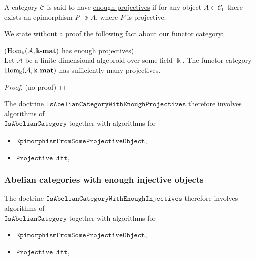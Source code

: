 \begin{definition}\label{def:enough_projectives}
A category $\mathcal{C}$ is said to have \ul{enough projectives} if for any object $A \in \mathcal{C}_{0}$
there exists an epimorphism $P \twoheadrightarrow A$, where $P$ is projective.
\end{definition}

We state without a proof the following fact about our functor category:

\begin{theorem}{($\mathrm{Hom_{\Bbbk}}(\mathcal{A},\Bbbk\textnormal{-}\mathbf{mat})$ has enough projectives)}\\
Let $\mathcal{A}$ be a finite-dimensional algebroid over some field $\Bbbk$. The functor category $\mathrm{Hom_{\Bbbk}}(\mathcal{A},\Bbbk\textnormal{-}\mathbf{mat})$ has sufficiently many
projectives.
\end{theorem}
\begin{proof}
(no proof)
\end{proof}

\begin{doctrine}
The doctrine $\mathtt{IsAbelianCategoryWithEnoughProjectives}$ therefore involves algorithms of\\
$\mathtt{IsAbelianCategory}$ together with algorithms for
\begin{itemize}
\item $\mathtt{EpimorphismFromSomeProjectiveObject}$,
\item $\mathtt{ProjectiveLift}$,
\end{itemize}
\end{doctrine}

\subsubsection{Abelian categories with enough injective objects}

\begin{doctrine}
The doctrine $\mathtt{IsAbelianCategoryWithEnoughInjectives}$ therefore involves algorithms of\\
$\mathtt{IsAbelianCategory}$ together with algorithms for
\begin{itemize}
\item $\mathtt{EpimorphismFromSomeProjectiveObject}$,
\item $\mathtt{ProjectiveLift}$,
\end{itemize}
\end{doctrine}
